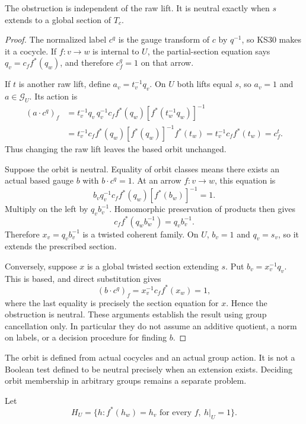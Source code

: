 \begin{theorem}\label{KS31}
The obstruction is independent of the raw lift. It is neutral exactly when \(s\) extends to a global section of \(T_c\).
\end{theorem}
\begin{proof}
The normalized label $c^q$ is the gauge transform of $c$ by $q^{-1}$, so KS30 makes it a cocycle. If $f:v\to w$ is internal to $U$, the partial-section equation says $q_v=c_ff^*(q_w)$, and therefore $c_f^q=1$ on that arrow.

If $t$ is another raw lift, define $a_v=t_v^{-1}q_v$. On $U$ both lifts equal $s$, so $a_v=1$ and $a\in\mathcal G_U$. Its action is
\[
\begin{aligned}
 (a\cdot c^q)_f
 &=t_v^{-1}q_v\,q_v^{-1}c_ff^*(q_w)
       [f^*(t_w^{-1}q_w)]^{-1}\\
 &=t_v^{-1}c_ff^*(q_w)
       [f^*(q_w)]^{-1}f^*(t_w)
 =t_v^{-1}c_ff^*(t_w)=c_f^t.
\end{aligned}
\]
Thus changing the raw lift leaves the based orbit unchanged.

Suppose the orbit is neutral. Equality of orbit classes means there exists an actual based gauge $b$ with $b\cdot c^q=1$. At an arrow $f:v\to w$, this equation is
\[
 b_vq_v^{-1}c_ff^*(q_w)[f^*(b_w)]^{-1}=1.
\]
Multiply on the left by $q_vb_v^{-1}$. Homomorphic preservation of products then gives
\[
 c_ff^*(q_wb_w^{-1})=q_vb_v^{-1}.
\]
Therefore $x_v=q_vb_v^{-1}$ is a twisted coherent family. On $U$, $b_v=1$ and $q_v=s_v$, so it extends the prescribed section.

Conversely, suppose $x$ is a global twisted section extending $s$. Put $b_v=x_v^{-1}q_v$. This is based, and direct substitution gives
\[
 (b\cdot c^q)_f
 =x_v^{-1}c_ff^*(x_w)=1,
\]
where the last equality is precisely the section equation for $x$. Hence the obstruction is neutral. These arguments establish the result using group cancellation only. In particular they do not assume an additive quotient, a norm on labels, or a decision procedure for finding $b$.
\end{proof}
The orbit is defined from actual cocycles and an actual group action. It is not a Boolean test defined to be neutral precisely when an extension exists. Deciding orbit membership in arbitrary groups remains a separate problem.

Let
\[
 H_U=\{h:f^*(h_w)=h_v\text{ for every }f,\ h|_U=1\}.
\]

